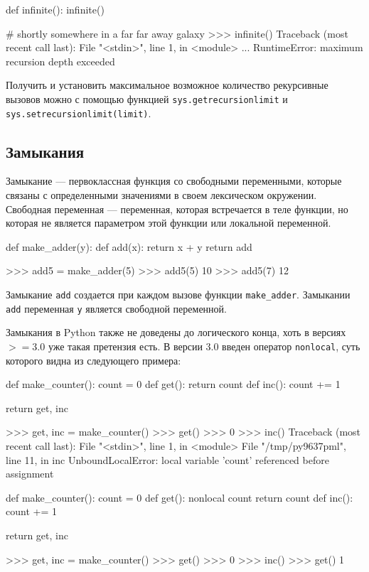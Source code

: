\begin{pylst}{}{}
def infinite():
    infinite()

# shortly somewhere in a far far away galaxy
>>> infinite()
Traceback (most recent call last):
  File "<stdin>", line 1, in <module>
...
RuntimeError: maximum recursion depth exceeded
\end{pylst}

Получить и установить максимальное возможное количество рекурсивные вызовов можно с помощью функцией \lstinline{sys.getrecursionlimit} и \lstinline{sys.setrecursionlimit(limit)}.

\subsection{Замыкания}
Замыкание --- первоклассная функция со свободными переменными, которые связаны с определенными значениями в своем лексическом окружении. Свободная переменная --- переменная, которая встречается в теле функции, но которая не является параметром этой функции или локальной переменной.
\begin{pylst}{}{}
def make_adder(y):
    def add(x):
        return x + y
    return add

>>> add5 = make_adder(5)
>>> add5(5)
10
>>> add5(7)
12
\end{pylst}

Замыкание \lstinline{add} создается при каждом вызове функции \lstinline{make_adder}. Замыкании \lstinline{add} переменная \lstinline{y} является свободной переменной.

Замыкания в Python также не доведены до логического конца, хоть в версиях $>=3.0$ уже такая претензия есть. В версии 3.0 введен оператор \lstinline{nonlocal}, суть которого видна из следующего примера:
\begin{pylst}{}{}
def make_counter():
    count = 0
    def get():
        return count
    def inc():
        count += 1

    return get, inc

>>> get, inc = make_counter()
>>> get()
>>> 0
>>> inc()
Traceback (most recent call last):
  File "<stdin>", line 1, in <module>
  File "/tmp/py9637pml", line 11, in inc
UnboundLocalError: local variable 'count' referenced before assignment

def make_counter():
    count = 0
    def get():
        nonlocal count
        return count
    def inc():
        count += 1

    return get, inc

>>> get, inc = make_counter()
>>> get()
>>> 0
>>> inc()
>>> get()
1
\end{pylst}

